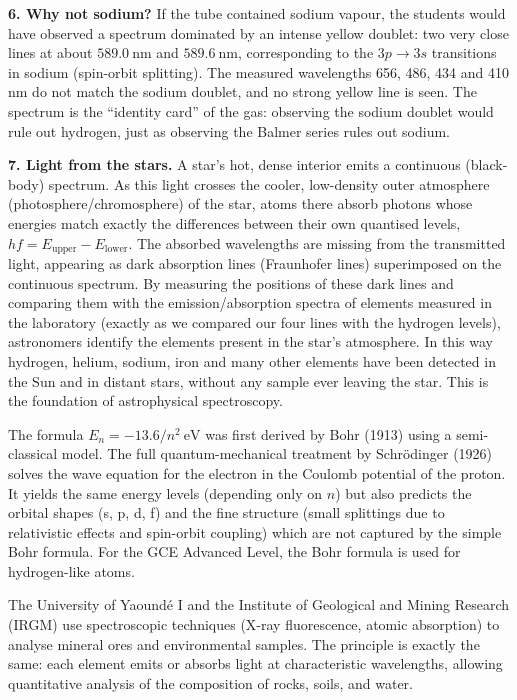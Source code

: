 \documentclass[11pt]{article}
\newcommand{\cle}[1]{{\popxbold\color{popdark}#1}}
\begin{document}
\begin{exoresolu}
\textbf{6. Why not sodium?}
If the tube contained sodium vapour, the students would have observed a spectrum dominated by an intense \cle{yellow doublet}: two very close lines at about $589.0\ \mathrm{nm}$ and $589.6\ \mathrm{nm}$, corresponding to the $3p \to 3s$ transitions in sodium (spin-orbit splitting). The measured wavelengths 656, 486, 434 and 410 nm do not match the sodium doublet, and no strong yellow line is seen. The spectrum is the ``identity card'' of the gas: observing the sodium doublet would rule out hydrogen, just as observing the Balmer series rules out sodium.

\textbf{7. Light from the stars.}
A star's hot, dense interior emits a continuous (black-body) spectrum. As this light crosses the cooler, low-density outer atmosphere (photosphere/chromosphere) of the star, atoms there absorb photons whose energies match exactly the differences between their own quantised levels, $hf = E_{\text{upper}} - E_{\text{lower}}$. The absorbed wavelengths are missing from the transmitted light, appearing as dark \cle{absorption lines} (Fraunhofer lines) superimposed on the continuous spectrum. By measuring the positions of these dark lines and comparing them with the emission/absorption spectra of elements measured in the laboratory (exactly as we compared our four lines with the hydrogen levels), astronomers identify the elements present in the star's atmosphere. In this way hydrogen, helium, sodium, iron and many other elements have been detected in the Sun and in distant stars, without any sample ever leaving the star. This is the foundation of \cle{astrophysical spectroscopy}.
\end{exoresolu}

\begin{savaistu}
The formula $E_n = -13.6/n^2\ \mathrm{eV}$ was first derived by Bohr (1913) using a semi-classical model. The full quantum-mechanical treatment by Schr\"odinger (1926) solves the wave equation for the electron in the Coulomb potential of the proton. It yields the same energy levels (depending only on $n$) but also predicts the orbital shapes (s, p, d, f) and the fine structure (small splittings due to relativistic effects and spin-orbit coupling) which are not captured by the simple Bohr formula. For the GCE Advanced Level, the Bohr formula is used for hydrogen-like atoms.
\end{savaistu}

\begin{savaistu}
The University of Yaound\'e I and the Institute of Geological and Mining Research (IRGM) use spectroscopic techniques (X-ray fluorescence, atomic absorption) to analyse mineral ores and environmental samples. The principle is exactly the same: each element emits or absorbs light at characteristic wavelengths, allowing quantitative analysis of the composition of rocks, soils, and water.
\end{savaistu}
\end{document}
